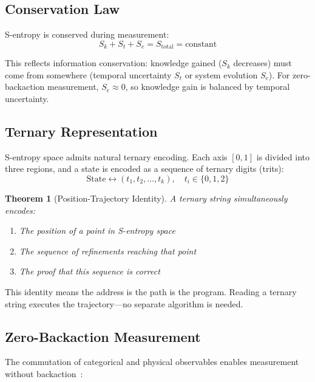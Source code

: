 \documentclass[twocolumn,aps,prx,superscriptaddress,longbibliography]{revtex4-2}
\newtheorem{theorem}{Theorem}[section]
\theoremstyle{remark}
\newcommand{\Sk}{S_k}
\newcommand{\St}{S_t}
\newcommand{\Se}{S_e}
\begin{document}
\subsection{Conservation Law}

S-entropy is conserved during measurement:
\begin{equation}
\Sk + \St + \Se = S_\text{total} = \text{constant}
\label{eq:conservation}
\end{equation}

This reflects information conservation: knowledge gained ($\Sk$ decreases)
must come from somewhere (temporal uncertainty $\St$ or system evolution
$\Se$). For zero-backaction measurement, $\Se \approx 0$, so knowledge
gain is balanced by temporal uncertainty.

\subsection{Ternary Representation}

S-entropy space admits natural ternary encoding. Each axis $[0,1]$ is
divided into three regions, and a state is encoded as a sequence of
ternary digits (trits):
\begin{equation}
\text{State} \leftrightarrow (t_1, t_2, \ldots, t_k), \quad t_i \in \{0, 1, 2\}
\label{eq:ternary}
\end{equation}

\begin{theorem}[Position-Trajectory Identity]
\label{thm:identity}
A ternary string simultaneously encodes:
\begin{enumerate}
    \item The position of a point in S-entropy space
    \item The sequence of refinements reaching that point
    \item The proof that this sequence is correct
\end{enumerate}
\end{theorem}

This identity means the address is the path is the program. Reading a
ternary string executes the trajectory---no separate algorithm is needed.

\subsection{Zero-Backaction Measurement}

The commutation of categorical and physical observables enables
measurement without backaction~\cite{Braginsky1980}:
\end{document}
